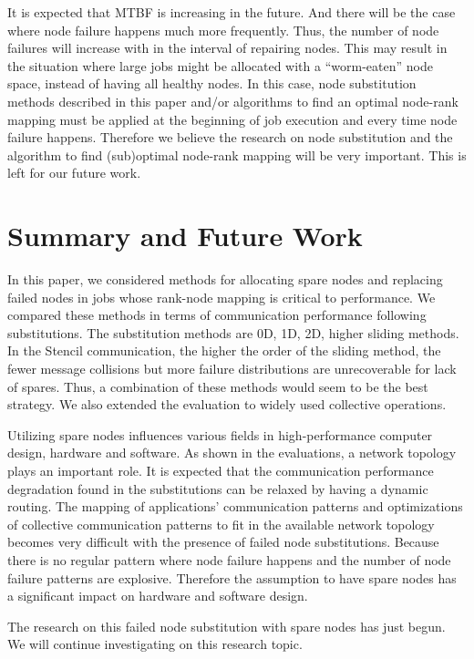 \documentclass[Afour,times,sagev]{sagej}
\begin{document}
It is expected that MTBF is increasing in the future. And there will
be the case where node failure happens much more frequently. Thus, the
number of node failures will increase with in the interval of
repairing nodes. This may result in the situation where large jobs
might be allocated with a ``worm-eaten'' node space, instead of having
all healthy nodes. In this case, node substitution methods described
in this paper and/or algorithms to find an optimal node-rank
mapping must be applied at the beginning of job execution and every time
node failure happens. Therefore we believe the research on node
substitution and the algorithm to find (sub)optimal node-rank mapping
will be very important. This is left for our future work.

\section{Summary and Future Work}

In this paper, we considered methods for allocating spare nodes and
replacing failed nodes in jobs whose rank-node mapping is critical to
performance. We compared these methods in terms of
communication performance following substitutions. The substitution
methods are 0D, 1D, 2D, higher sliding methods. In the Stencil 
communication, the higher the order of the sliding method, the fewer
message collisions but more failure distributions are unrecoverable
for lack of spares. Thus, a combination of these methods would seem
to be the best strategy. We also extended the evaluation to widely
used collective operations. 

Utilizing spare nodes influences various fields in high-performance
computer design, hardware and software. As shown in the evaluations,
a network topology plays an important role. It is expected that the
communication performance degradation found in the substitutions can
be relaxed by having a dynamic routing. The mapping of applications'
communication patterns and optimizations of collective
communication patterns to fit in the available network topology becomes
very difficult with the presence of failed node substitutions. Because 
there is no regular pattern where node failure happens and the
number of node failure patterns are explosive. Therefore the
assumption to have spare nodes has a significant impact on hardware
and software design.

The research on this failed node substitution with spare nodes has
just begun. We will continue investigating on this research topic.
\end{document}
